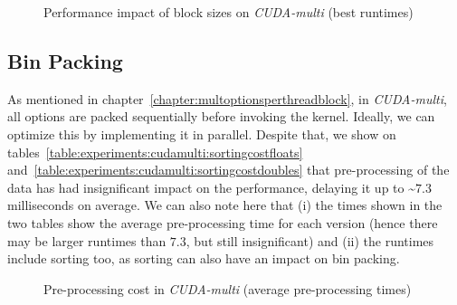 \begin{figure}[H]
\begin{subfigure}{.49\textwidth}
\end{subfigure}
\begin{center}
  \small
\end{center}
\begin{center}
  \small
\end{center}
\caption{Performance impact of block sizes on \textit{CUDA-multi} (best runtimes)}
\label{fig:experiments:cudamulti:blocks}
\end{figure}

\newpage
\subsection{Bin Packing}
As mentioned in chapter~\ref{chapter:multoptionsperthreadblock}, in \textit{CUDA-multi}, all options are packed sequentially before invoking the kernel. Ideally, we can optimize this by implementing it in parallel. Despite that, we show on tables~\ref{table:experiments:cudamulti:sortingcostfloats} and~\ref{table:experiments:cudamulti:sortingcostdoubles} that pre-processing of the data has had insignificant impact on the performance, delaying it up to \textasciitilde$7.3$ milliseconds on average. We can also note here that (i) the times shown in the two tables show the average pre-processing time for each version (hence there may be larger runtimes than $7.3$, but still insignificant) and (ii) the runtimes include sorting too, as sorting can also have an impact on bin packing.  

\begin{figure}[H]
\begin{center}
  \small
  \label{table:experiments:cudamulti:sortingcostfloats}
\end{center}
\begin{center}
  \small
  \label{table:experiments:cudamulti:sortingcostdoubles}
\end{center}
\caption{Pre-processing cost in \textit{CUDA-multi} (average pre-processing times)}
\label{fig:experiments:cudamulti:prep}
\end{figure}

